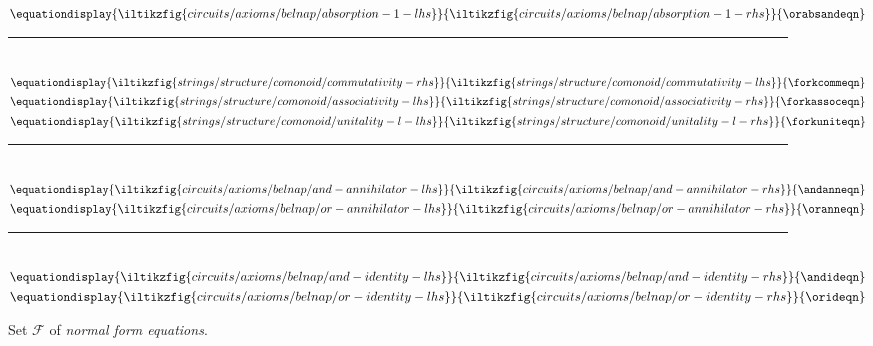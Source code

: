 \begin{figure*}
{    }{\andabsoreqn}\)
    \quad
    \(\equationdisplay{
        \iltikzfig{circuits/axioms/belnap/absorption-1-lhs}
    }{
        \iltikzfig{circuits/axioms/belnap/absorption-1-rhs}
    }{\orabsandeqn}\)
    \\[0.25em]
    \rule{\textwidth}{0.1mm}
    \\[0.7em]
    \(\equationdisplay{
        \iltikzfig{strings/structure/comonoid/commutativity-rhs}
    }{
        \iltikzfig{strings/structure/comonoid/commutativity-lhs}
    }{\forkcommeqn}\)
    \quad
    \(\equationdisplay{
        \iltikzfig{strings/structure/comonoid/associativity-lhs}
    }{
        \iltikzfig{strings/structure/comonoid/associativity-rhs}
    }{\forkassoceqn}\)
    \quad
    \(\equationdisplay{
        \iltikzfig{strings/structure/comonoid/unitality-l-lhs}
    }{
        \iltikzfig{strings/structure/comonoid/unitality-l-rhs}
    }{\forkuniteqn}\)
    \\[0.25em]
    \rule{\textwidth}{0.1mm}
    \\[0.7em]
    \(\equationdisplay{
        \iltikzfig{circuits/axioms/belnap/and-annihilator-lhs}
    }{
        \iltikzfig{circuits/axioms/belnap/and-annihilator-rhs}
    }{\andanneqn}\)
    \quad
    \(\equationdisplay{
        \iltikzfig{circuits/axioms/belnap/or-annihilator-lhs}
    }{
        \iltikzfig{circuits/axioms/belnap/or-annihilator-rhs}
    }{\oranneqn}\)
    \\[0.25em]
    \rule{\textwidth}{0.1mm}
    \\[0.7em]
    \(\equationdisplay{
        \iltikzfig{circuits/axioms/belnap/and-identity-lhs}
    }{
        \iltikzfig{circuits/axioms/belnap/and-identity-rhs}
    }{\andideqn}\)
    \quad
    \(\equationdisplay{
        \iltikzfig{circuits/axioms/belnap/or-identity-lhs}
    }{
        \iltikzfig{circuits/axioms/belnap/or-identity-rhs}
    }{\orideqn}\)
    \caption{
        Set \(\mathcal{F}\) of \emph{normal form equations}.
    }
    \label{fig:normal-form-equations}
\end{figure*}

